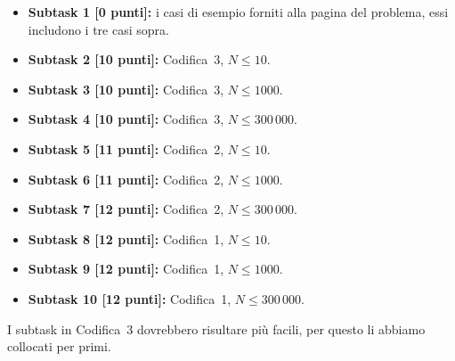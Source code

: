 \documentclass[a4paper,11pt]{article}
\begin{document}
\begin{itemize}
\item \textbf{Subtask 1 [0 punti]:} i casi di esempio forniti alla pagina del problema, essi includono i tre casi sopra.
\item \textbf{Subtask 2 [10 punti]:} Codifica~3, $N \le 10$.
\item \textbf{Subtask 3 [10 punti]:} Codifica~3, $N \le 1000$.
\item \textbf{Subtask 4 [10 punti]:} Codifica~3, $N \le 300\,000$.
\item \textbf{Subtask 5 [11 punti]:} Codifica~2, $N \le 10$.
\item \textbf{Subtask 6 [11 punti]:} Codifica~2, $N \le 1000$.
\item \textbf{Subtask 7 [12 punti]:} Codifica~2, $N \le 300\,000$.
\item \textbf{Subtask 8 [12 punti]:} Codifica~1, $N \le 10$.
\item \textbf{Subtask 9 [12 punti]:} Codifica~1, $N \le 1000$.
\item \textbf{Subtask 10 [12 punti]:} Codifica~1, $N \le 300\,000$.
\end{itemize}

I subtask in Codifica~3 dovrebbero risultare più facili, per questo li abbiamo collocati per primi.
\end{document}

